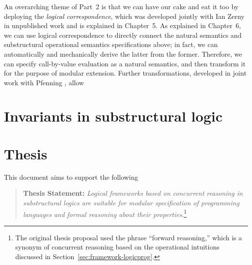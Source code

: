 An overarching theme of Part~2 is that we can have our cake and eat it
too by deploying the {\it logical correspondence}, which was developed
jointly with Ian Zerny in unpublished work and is explained in
Chapter~5. As explained in Chapter~6, we can use logical
correspondence to directly connect the natural semantics and
substructural operational semantics specifications above; in fact, we
can automatically and mechanically derive the latter from the
former. Therefore, we can specify call-by-value evaluation as a
natural semantics, and then transform it for the purpose of modular
extension. Further transformations, developed in joint work with
Pfenning \cite{simmons11logical}, allow 

\section{Invariants in substructural logic}

\section{Thesis}

This document aims to support the following

\begin{quote} {\bf Thesis Statement:} {\it Logical frameworks based on
    concurrent reasoning in substructural logics are suitable for
    modular specification of programming languages and formal
    reasoning about their properties}.\footnote{The original thesis
    proposal used the phrase ``forward reasoning,'' which is a synonym
    of concurrent reasoning based on the operational intuitions
    discussed in Section~\ref{sec:framework-logicprog}.}
\end{quote}
